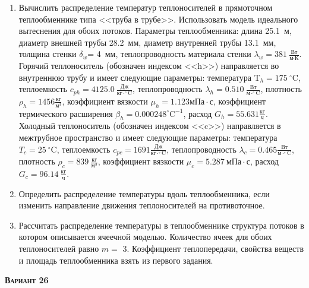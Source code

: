 \begin{enumerate} 
\item Вычислить распределение температур теплоносителей в прямоточном теплообменнике типа <<труба в трубе>>. Использовать модель идеального вытеснения для обоих потоков. Параметры теплообменника: длина  25.1~м, диаметр внешней трубы 28.2~мм,  диаметр внутренней трубы 13.1~мм, толщина стенки $\delta_{w}$=     4~мм,  теплопроводность материала стенки $\lambda_{w}=  381~\frac{\text{Вт}}{\text{м} \cdot \text{К}}$.  Горячий теплоноситель (обозначен индексом <<h>>) направляется во внутреннюю трубу и	 имеет следующие параметры: температура $\text{T}_{h}= 175~^\circ\mathrm{C}$, теплоемкость	  $c_{p{h}}= 4125.0~\frac{\text{Дж}}{\text{кг} \cdot ^\circ\mathrm{C}}$, теплопроводность 		$\lambda_{h}= 0.510~\frac{\text{Вт}}{\text{м} \cdot ^\circ\mathrm{C}}$, плотность 		$\rho_{h}= 1456 \frac{\text{кг}}{\text{м}^3}$, коэффициент вязкости $\mu_{h}=1.123 \text{мПа} 		\cdot \text{с} $, коэффициент термического расширения $\beta_{h}=0.000248 ^\circ\mathrm{C}^{-1}$,		 расход $G_{h}= 55.631 \frac{\text{кг}}{\text{ч}}$. Холодный теплоноситель (обозначен индексом <<c>>) 		 направляется в межтрубное пространство и имеет следующие параметры: температура $T_{c}=   25		 ~^\circ\mathrm{C}$, теплоемкость $c_{p{c}}= 1691 \frac{\text{Дж}}{\text{кг} \cdot ^\circ\mathrm{C}}$,			 теплопроводность $\lambda_{c}=0.465 \frac{\text{Вт}}{\text{м} \cdot ^\circ\mathrm{C}}$, плотность 			 $\rho_{c}=   839~\frac{\text{кг}}{\text{м}^3}$, коэффициент вязкости $\mu_{c}=5.287~\text{мПа} \cdot \text{с} $, 			 расход $G_{c}=96.14~\frac{\text{кг}}{\text{ч}}$. 

\item Определить распределение температуры вдоль теплообменника, если 	изменить направление движения теплоносителей на противоточное.

\item Рассчитать распределение температуры в теплообменнике структура потоков в котором описывается ячеечной моделью. Количество ячеек для обоих теплоносителей равно $m = $ 3. Коэффициент теплопередачи, свойства веществ и площадь теплообменника взять из первого задания.

\end{enumerate}

\textsc{\textbf{Вариант 26}}

